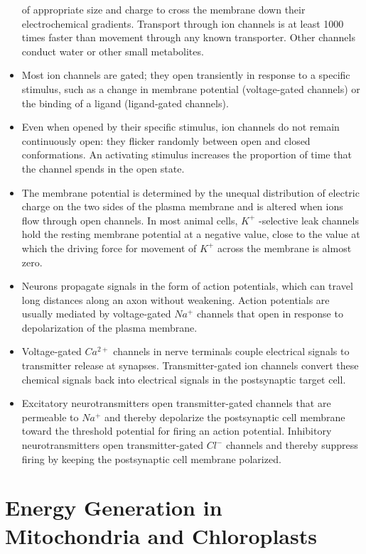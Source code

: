 \begin{itemize}
of appropriate size and charge to cross the membrane down their
electrochemical gradients. Transport through ion channels is at least
1000 times faster than movement through any known transporter.
Other channels conduct water or other small metabolites.
\item Most ion channels are gated; they open transiently in response to a
specific stimulus, such as a change in membrane potential (voltage-gated
channels) or the binding of a ligand (ligand-gated channels).
\item Even when opened by their specific stimulus, ion channels do not
remain continuously open: they flicker randomly between open and
closed conformations. An activating stimulus increases the proportion
of time that the channel spends in the open state.
\item The membrane potential is determined by the unequal distribution
of electric charge on the two sides of the plasma membrane and is
altered when ions flow through open channels. In most animal cells,
$K^{+}$ -selective leak channels hold the resting membrane potential at
a negative value, close to the value at which the driving force for
movement of $K^{+}$ across the membrane is almost zero.
\item Neurons propagate signals in the form of action potentials, which
can travel long distances along an axon without weakening. Action
potentials are usually mediated by voltage-gated $Na^{+}$ channels that
open in response to depolarization of the plasma membrane.
\item Voltage-gated $Ca^{2+}$ channels in nerve terminals couple electrical
signals to transmitter release at synapses. Transmitter-gated ion
channels convert these chemical signals back into electrical signals
in the postsynaptic target cell.
\item Excitatory neurotransmitters open transmitter-gated channels that
are permeable to $Na^{+}$ and thereby depolarize the postsynaptic cell
membrane toward the threshold potential for firing an action potential.
Inhibitory neurotransmitters open transmitter-gated $Cl^{-}$ channels
and thereby suppress firing by keeping the postsynaptic cell membrane polarized.
\end{itemize}

\chapter{Energy Generation in Mitochondria and Chloroplasts}

































